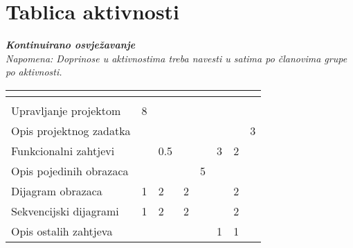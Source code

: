 \begin{packed_enum}
			
			
			
			
		\end{packed_enum}
		
		\eject
		\section*{Tablica aktivnosti}
		
			\textbf{\textit{Kontinuirano osvježavanje}}\\
			
			 \textit{Napomena: Doprinose u aktivnostima treba navesti u satima po članovima grupe po aktivnosti.}
					
						
			
			\begin{longtabu} to \textwidth {|X[7, l]|X[1, c]|X[1, c]|X[1, c]|X[1, c]|X[1, c]|X[1, c]|X[1, c]|}
								
				  &      &  &	 &	 &
				 &
				 &	 \\ \hline 
				\endfirsthead
				
			
				  &      &  &	 &
				 &	 &
				 &	 \\ \hline 
				\endhead
				
				
				\endfoot
							
				 
				\endlastfoot
				
				Upravljanje projektom 		& 8 &  &  &  &  &  & \\ \hline
				Opis projektnog zadatka 	&  &  &  &  &  &  & 3\\ \hline
				
				Funkcionalni zahtjevi       &  & 0.5 &  &  & 3 & 2 &  \\ \hline
				Opis pojedinih obrazaca 	&  &  &  & 5 &  &  & \\ \hline
				Dijagram obrazaca 			& 1 & 2 & 2 &  &  & 2 &  \\ \hline
				Sekvencijski dijagrami 		& 1 & 2 & 2 &  &  & 2 &  \\ \hline
				Opis ostalih zahtjeva 		&  &  &  &  & 1 & 1 &  \\ \hline


\end{longtabu}
